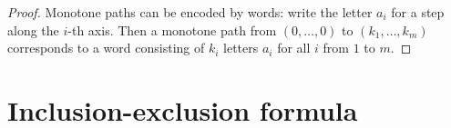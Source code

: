 \begin{page}
\setcounter{section}{5}
\setcounter{subsection}{0}
\setcounter{dfn}{3}
\label{portion:145}

\begin{proof}
Monotone paths can be encoded by words: write the letter $a_i$ for a step along the $i$-th axis.
Then a monotone path from $(0, \ldots, 0)$ to $(k_1, \ldots, k_m)$ corresponds to a word
consisting of $k_i$ letters $a_i$ for all $i$ from $1$ to $m$.
\end{proof}




\end{page}

\begin{page}
\setcounter{section}{5}
\setcounter{subsection}{1}
\setcounter{dfn}{0}
\label{portion:147}

\section{Inclusion-exclusion formula}

\end{page}

